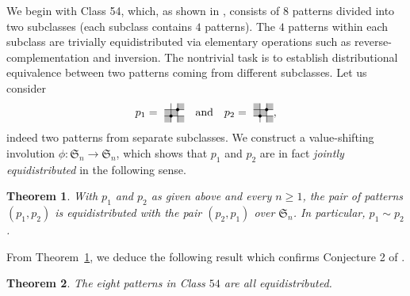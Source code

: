 \documentclass[12pt]{article}
\newtheorem{thm}{Theorem}[section]
\def\fS{\mathfrak{S}}
\newcommand{\pattern}[4]{										
	\raisebox{0.6ex}{
		\begin{tikzpicture}[scale=0.35, baseline=(current bounding box.center), #1]
		\foreach \x/\y in {#4}		\fill[gray!50] (\x,\y) rectangle +(1,1);

		\draw (0.01,0.01) grid (#2+0.99,#2+0.99);
		\foreach \x/\y in {#3}		\filldraw (\x,\y) circle (6pt);
		\end{tikzpicture}}
}
\begin{document}
We begin with Class 54, which, as shown in \cite[Tab.~5]{SKZ2026}, consists of $8$ patterns divided into two subclasses (each subclass contains $4$ patterns). The $4$ patterns within each subclass are trivially equidistributed via elementary operations such as reverse-complementation and inversion. The nontrivial task is to establish distributional equivalence between two patterns coming from different subclasses. Let us consider
\[
p_1=\pattern{scale=0.6}{2}{1/1,2/2}{0/0,0/1,1/1,2/0,2/2}
\quad \text{and} \quad
p_2=\pattern{scale=0.6}{2}{1/1,2/2}{0/2,0/1,1/1,2/0,2/2},
\]
indeed two patterns from separate subclasses. We construct a value-shifting involution $\phi: \mathfrak{S}_n \to \mathfrak{S}_n$, which shows that $p_1$ and $p_2$ are in fact \emph{jointly equidistributed} in the following sense.

\begin{thm}\label{thm:class54-joint equi}
With $p_1$ and $p_2$ as given above and every $n\ge 1$, the pair of patterns $(p_1,p_2)$ is equidistributed with the pair $(p_2,p_1)$ over $\fS_n$. In particular, $p_1\sim p_2$.
\end{thm}

From Theorem~\ref{thm:class54-joint equi}, we deduce the following result which confirms Conjecture 2 of \cite{SKZ2026}.
\begin{thm}\label{thm:class54-equi}
The eight patterns in Class $54$ are all equidistributed.
\end{thm}
\end{document}
